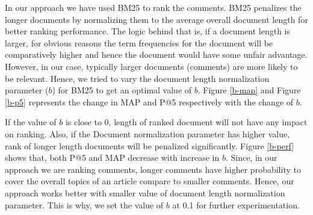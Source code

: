 \documentclass[article]{IEEEtran}
\begin{document}
In our approach we have used BM25 to rank the comments. BM25 penalizes the longer documents by normalizing them to the average overall document length for better ranking performance. The logic behind that is, if a document length is larger, for obvious reasons the term frequencies for the document will be comparatively higher and hence the document would have some unfair advantage. However, in our case, typically larger documents (comments) are more likely to be relevant. Hence, we tried to vary the document length normalization parameter ($b$) for BM25 to get an optimal value of $b$.  Figure \ref{b-map} and Figure \ref{b-p5} represents the change in MAP and P@5 respectively with the change of $b$. 

If the value of $b$ is close to 0, length of ranked document will not have any impact on ranking. Also, if the Document normalization parameter has higher value, rank of longer length documents will be penalized significantly. Figure \ref{b-perf} shows that, both P@5 and MAP decrease with increase in $b$. Since, in our approach we are ranking comments, longer comments have higher probability to cover the overall topics of an article compare to smaller comments. Hence, our approach works better with smaller value of document length normalization parameter. This is why, we set the value of $b$ at 0.1 for further experimentation.
\end{document}
